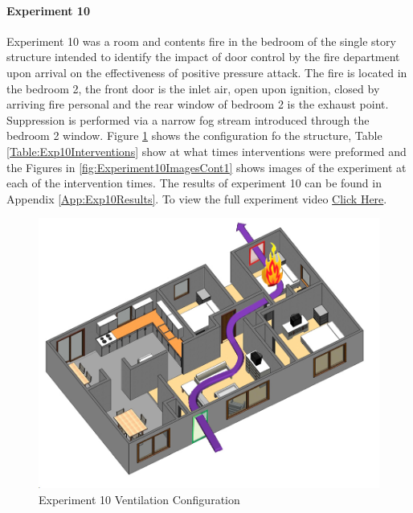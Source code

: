 \documentclass{article}
\begin{document}
\paragraph{Experiment 10}\mbox{}

Experiment 10 was a room and contents fire in the bedroom of the single story structure intended to identify the impact of door control by the fire department upon arrival on the effectiveness of positive pressure attack. The fire is located in the bedroom 2, the front door is the inlet air, open upon ignition, closed by arriving fire personal and the rear window of bedroom 2 is the exhaust point. Suppression is performed via a narrow fog stream introduced through the bedroom 2 window. Figure \ref{fig:Exp10VentConfig} shows the configuration fo the structure, Table \ref{Table:Exp10Interventions} show at what times interventions were preformed and the Figures in \ref{fig:Experiment10ImagesCont1} shows images of the experiment at each of the intervention times. The results of experiment 10 can be found in Appendix \ref{App:Exp10Results}. To view the full experiment video \href{https://youtu.be/e76r4kRpdQg}{Click Here}.

\begin{figure}[H]
	\centering
	\includegraphics[width=5in]{0_Images/FireExperiments/Single_Story/Experiment_10.jpg}
	\caption{Experiment 10 Ventilation Configuration}
	\label{fig:Exp10VentConfig}
\end{figure}
\end{document}
